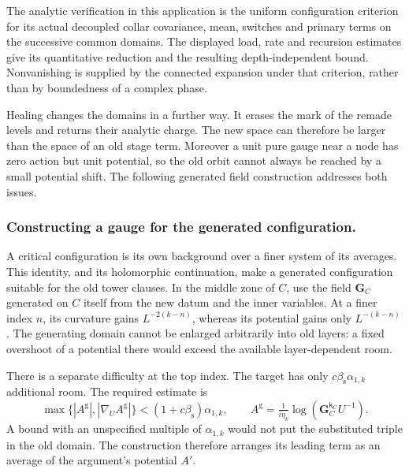 \documentclass[11pt,letterpaper,reqno]{amsart}
\theoremstyle{definition}
\theoremstyle{remark}
\begin{document}
The analytic verification in this application is the
uniform configuration criterion for its actual
decoupled collar covariance, mean, switches and
primary terms on the successive common domains.
The displayed load, rate and recursion estimates
give its quantitative reduction and the resulting
depth-independent bound. Nonvanishing is supplied
by the connected expansion under that criterion,
rather than by boundedness of a complex phase.

Healing changes the domains
in a further way. It erases
the mark of the remade levels
and returns their analytic
charge. The new space can
therefore be larger than the
space of an old stage term.
Moreover a unit pure gauge
near a node has zero action
but unit potential, so the old
orbit cannot always be
reached by a small potential
shift. The following generated
field construction addresses
both issues.

\subsubsection*{Constructing a gauge for the generated configuration.}

A critical configuration is its own background over a finer
system of its averages. This identity, and its holomorphic
continuation, make a generated configuration suitable for
the old tower clauses. In the middle zone of \(C\), use
the field \(\mathbf G_C\) generated on \(C\) itself from
the new datum and the inner variables. At a finer index
\(n\), its curvature gains \(L^{-2(k-n)}\), whereas its
potential gains only \(L^{-(k-n)}\).
The generating domain cannot be enlarged arbitrarily
into old layers: a fixed overshoot of a potential there
would exceed the available layer-dependent room.

There is a separate difficulty at the top index. The
target has only \(c\beta_{\mathrm s}\alpha_{1,k}\)
additional room. The required estimate is
\begin{equation}\label{eq:xrg-generated-gauge-bound}
 \max\{|A^{\mathrm g}|,|\nabla_UA^{\mathrm g}|\}
          <(1+c\beta_{\mathrm s})\alpha_{1,k},\qquad
 A^{\mathrm g}=\tfrac1{i\eta_k}
                 \log(\mathbf G_C^{\mathsf k_C}U^{-1}).
\end{equation}
A bound with an unspecified multiple of \(\alpha_{1,k}\)
would not put the substituted triple in the old domain.
The construction therefore arranges its leading term
as an average of the argument's potential \(A'\).
\end{document}
